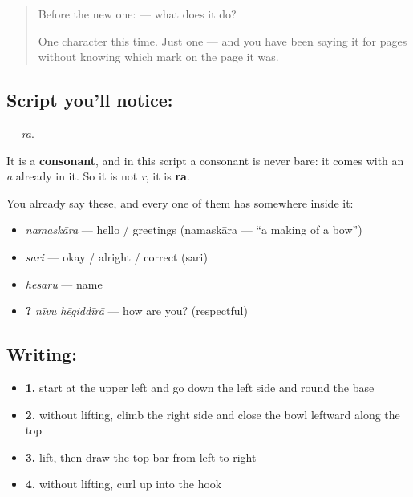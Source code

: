 \label{lesson:KA-S07-letter-ra}



\begin{quote}
Before the new one:  — what does it do?

One character this time. Just one — and you have been saying it for pages without knowing which mark on the page it was.
\end{quote}

\subsection*{Script you'll notice: }
\textbf{} — \emph{ra}.

It is a \textbf{consonant}, and in this script a consonant is never bare: it comes with an \emph{a} already in it. So it is not \emph{r}, it is \textbf{ra}.

You already say these, and every one of them has  somewhere inside it:

\begin{itemize}
\raggedright
  \item \textbf{} \emph{namaskāra} — hello / greetings (namaskāra — \textquotedblleft{}a making of a bow\textquotedblright{})
  \item \textbf{} \emph{sari} — okay / alright / correct (sari)
  \item \textbf{} \emph{hesaru} — name
  \item \textbf{ ?} \emph{nīvu hēgiddīrā} — how are you? (respectful)
\end{itemize}

\subsection*{Writing: }

\begin{itemize}
\raggedright
  \item \textbf{1.} start at the upper left and go down the left side and round the base
  \item \textbf{2.} without lifting, climb the right side and close the bowl leftward along the top
  \item \textbf{3.} lift, then draw the top bar from left to right
  \item \textbf{4.} without lifting, curl up into the hook
\end{itemize}

